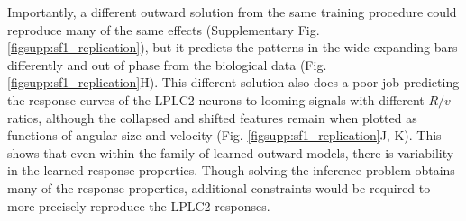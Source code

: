 \documentclass[pdftex,9pt,lineno]{elife}
\begin{document}
Importantly, a different outward solution from the same training procedure could reproduce many of the same effects (Supplementary Fig. \ref{figsupp:sf1_replication}), but it predicts the patterns in the wide expanding bars differently and out of phase from the biological data (Fig. \ref{figsupp:sf1_replication}H). This different solution also does a poor job predicting the response curves of the LPLC2 neurons to looming signals with different $R/v$ ratios, although the collapsed and shifted features remain when plotted as functions of angular size and velocity (Fig. \ref{figsupp:sf1_replication}J, K). This shows that even within the family of learned outward models, there is variability in the learned response properties. Though solving the inference problem obtains many of the response properties, additional constraints would be required to more precisely reproduce the LPLC2 responses.
\end{document}
